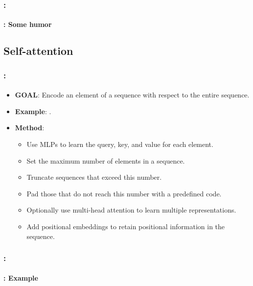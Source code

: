 \documentclass[xcolor=table]{beamer}
\begin{document}
\begin{frame}
	\frametitle{\insertshortsubtitle: \insertsection}
	\framesubtitle{\insertsubsection: Some humor}
	
	\begin{center}
	\end{center}
	
\end{frame}



\subsection{Self-attention}

\begin{frame}
	\frametitle{\insertshortsubtitle: \insertsection}
	\framesubtitle{\insertsubsection}
	
	\begin{itemize}
		\item \textbf{GOAL}: Encode an element of a sequence with respect to the entire sequence.
		\item \textbf{Example}: .
		\item \textbf{Method}:
		\begin{itemize}
			\item Use MLPs to learn the query, key, and value for each element.
			\item Set the maximum number of elements in a sequence.
			\item Truncate sequences that exceed this number.
			\item Pad those that do not reach this number with a predefined code.
			\item Optionally use multi-head attention to learn multiple representations.
			\item Add positional embeddings to retain positional information in the sequence.
		\end{itemize}
	\end{itemize}
	
\end{frame}

\begin{frame}
	\frametitle{\insertshortsubtitle: \insertsection}
	\framesubtitle{\insertsubsection: Example}
	
	\begin{center}
	\end{center}
	
\end{frame}
\end{document}
